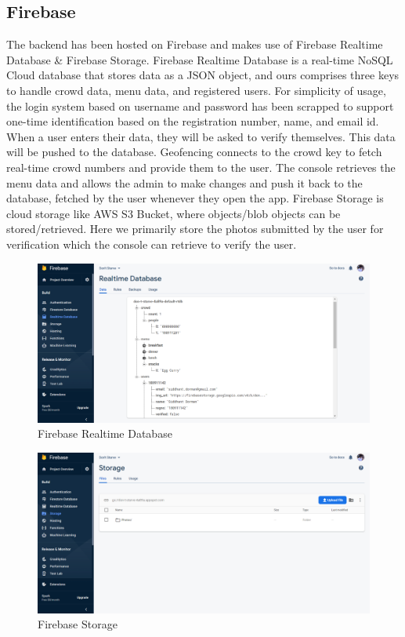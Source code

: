 \documentclass[12pt]{article}
\begin{document}
\subsection*{Firebase}
{\justify
The backend has been hosted on Firebase and makes use of Firebase Realtime Database \& Firebase Storage. 
Firebase Realtime Database is a real-time NoSQL Cloud database that stores data as a JSON object, and ours comprises three keys to handle crowd data, menu data, and registered users. For simplicity of usage, the login system based on username and password has been scrapped to support one-time identification based on the registration number, name, and email id. When a user enters their data, they will be asked to verify themselves. This data will be pushed to the database. Geofencing connects to the crowd key to fetch real-time crowd numbers and provide them to the user. The console retrieves the menu data and allows the admin to make changes and push it back to the database, fetched by the user whenever they open the app. 
Firebase Storage is cloud storage like AWS S3 Bucket, where objects/blob objects can be stored/retrieved. Here we primarily store the photos submitted by the user for verification which the console can retrieve to verify the user.
}
\vskip1cm
\begin{figure}[H]
    \centering
    \includegraphics[width=0.7\linewidth]{rtdb.png}
    \caption{Firebase Realtime Database}
\end{figure}
\begin{figure}[H]
    \centering
    \includegraphics[width=0.7\linewidth]{storage.png}
    \caption{Firebase Storage}
\end{figure}
\end{document}
